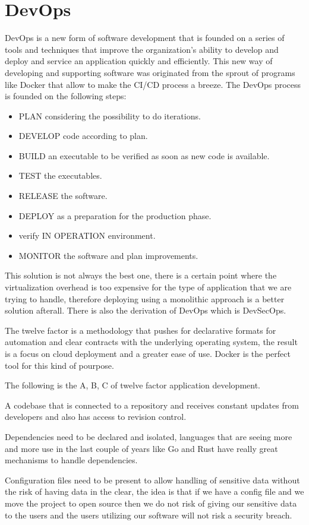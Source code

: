 \chapter{DevOps}
DevOps is a new form of software development that is founded on a series of tools and techniques
that improve the organization's ability to develop and deploy and service an application quickly and
efficiently. This new way of developing and supporting software was originated from the sprout of
programs like Docker that allow to make the CI/CD process a breeze. The DevOps process is founded on
the following steps:
\begin{itemize}
	\item PLAN considering the possibility to do iterations.
	\item DEVELOP code according to plan.
	\item BUILD an executable to be verified as soon as new code is available.
	\item TEST the executables.
	\item RELEASE the software.
	\item DEPLOY as a preparation for the production phase.
	\item verify IN OPERATION environment.
	\item MONITOR the software and plan improvements.
\end{itemize}
This solution is not always the best one, there is a certain point where the virtualization overhead
is too expensive for the type of application that we are trying to handle, therefore deploying using
a monolithic approach is a better solution afterall. There is also the derivation of DevOps which is DevSecOps.

The twelve factor is a methodology that pushes for declarative formats for automation and clear
contracts with the underlying operating system, the result is a focus on cloud deployment and a
greater ease of use. Docker is the perfect tool for this kind of pourpose.

The following is the A, B, C of twelve factor application development.

A codebase that is connected to a repository and receives constant updates from developers and also
has access to revision control.

Dependencies need to be declared and isolated, languages that are seeing more and more use in the
last couple of years like Go and Rust have really great mechanisms to handle dependencies.

Configuration files need to be present to allow handling of sensitive data without the risk of
having data in the clear, the idea is that if we have a config file and we move the project to open
source then we do not risk of giving our sensitive data to the users and the users utilizing our
software will not risk a security breach.

